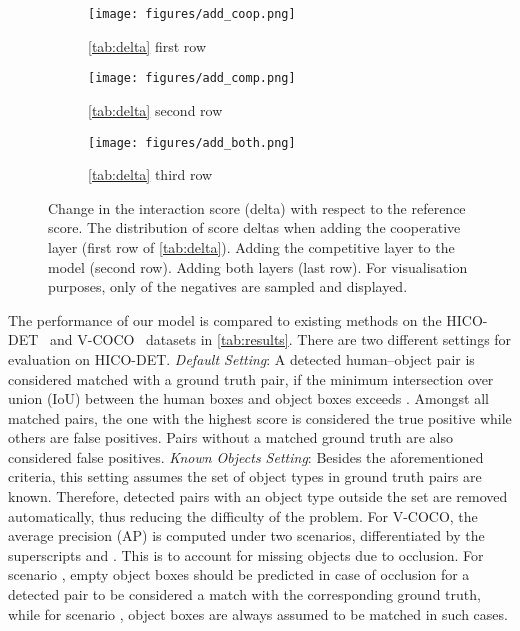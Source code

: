 \documentclass[10pt,twocolumn,letterpaper]{article}
\begin{document}
\begin{figure*}[t]
    \begin{subfigure}[t]{0.33\linewidth}
        \centering
        \texttt{[image: figures/add\_coop.png]}
        \caption{\cref{tab:delta} first row}
        \label{fig:scatter-left}
    \end{subfigure}
    \begin{subfigure}[t]{0.33\linewidth}
        \centering
        \texttt{[image: figures/add\_comp.png]}
        \caption{\cref{tab:delta} second row}
        \label{fig:scatter-mid}
    \end{subfigure}
    \begin{subfigure}[t]{0.33\linewidth}
        \centering
        \texttt{[image: figures/add\_both.png]}
        \caption{\cref{tab:delta} third row}
        \label{fig:scatter-right}
    \end{subfigure}
    \caption{Change in the interaction score (delta) with respect to the reference score.  The distribution of score deltas when adding the cooperative layer (first row of \cref{tab:delta}).  Adding the competitive layer to the model (second row).  Adding both layers (last row). For visualisation purposes, only  of the negatives are sampled and displayed.
    }
    \label{fig:scatter}
\end{figure*}

The performance of our model is compared to existing methods on the HICO-DET~\cite{hicodet} and V-COCO~\cite{vcoco} datasets in \cref{tab:results}. There are two different settings for evaluation on HICO-DET. \textit{Default Setting}: A detected human--object pair is considered matched with a ground truth pair, if the minimum intersection over union (IoU) between the human boxes and object boxes exceeds . Amongst all matched pairs, the one with the highest score is considered the true positive while others are false positives. Pairs without a matched ground truth are also considered false positives. \textit{Known Objects Setting}: Besides the aforementioned criteria, this setting assumes the set of object types in ground truth pairs are known. Therefore, detected pairs with an object type outside the set are removed automatically, thus reducing the difficulty of the problem. For V-COCO, the average precision (AP) is computed under two scenarios, differentiated by the superscripts  and . This is to account for missing objects due to occlusion. For scenario , empty object boxes should be predicted in case of occlusion for a detected pair to be considered a match with the corresponding ground truth, while for scenario , object boxes are always assumed to be matched in such cases.
\end{document}
